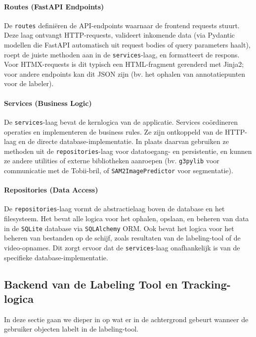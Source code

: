 \paragraph{Routes (FastAPI Endpoints)}
De \texttt{routes} definiëren de API-endpoints waarnaar de frontend requests stuurt.\\
Deze laag ontvangt HTTP-requests, valideert inkomende data 
(via Pydantic modellen die FastAPI automatisch uit request bodies of query parameters haalt), 
roept de juiste methoden aan in de \texttt{services}-laag, en formatteert de respons. 
Voor HTMX-requests is dit typisch een HTML-fragment gerenderd met Jinja2; voor andere endpoints kan dit JSON zijn 
(bv. het ophalen van annotatiepunten voor de labeler).

\paragraph{Services (Business Logic)}
De \texttt{services}-laag bevat de kernlogica van de applicatie.
Services coördineren operaties en implementeren de business rules. 
Ze zijn ontkoppeld van de HTTP-laag en de directe database-implementatie. 
In plaats daarvan gebruiken ze methoden uit de \texttt{repositories}-laag voor datatoegang- en persistentie, 
en kunnen ze andere utilities of externe bibliotheken aanroepen (bv. \texttt{g3pylib} voor communicatie met de Tobii-bril, of \texttt{SAM2ImagePredictor} voor segmentatie).

\paragraph{Repositories (Data Access)}
De \texttt{repositories}-laag vormt de abstractielaag boven de database en het filesysteem.
Het bevat alle logica voor het ophalen, opslaan, en beheren van data in de \texttt{SQLite} database via \texttt{SQLAlchemy} ORM.
Ook bevat het logica voor het beheren van bestanden op de schijf, zoals resultaten van de labeling-tool of de video-opnames.
Dit zorgt ervoor dat de \texttt{services}-laag onafhankelijk is van de specifieke database-implementatie.

\subsection{Backend van de Labeling Tool en Tracking-logica}
\label{sec:labeling-tool-logic}

In deze sectie gaan we dieper in op wat er in de achtergrond gebeurt wanneer de gebruiker objecten labelt in de labeling-tool.

